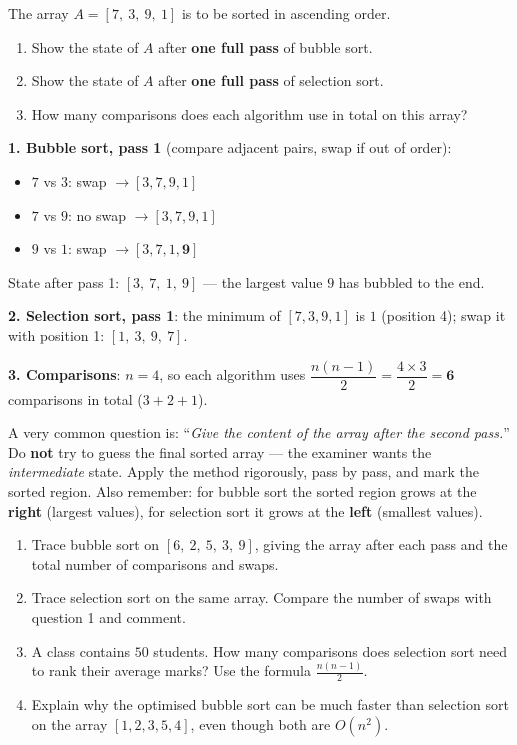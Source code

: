 \documentclass[11pt]{article}
\begin{document}
\begin{exoresolu}
The array $A = [7,\ 3,\ 9,\ 1]$ is to be sorted in ascending order.
\begin{enumerate}
\item Show the state of $A$ after \textbf{one full pass} of bubble sort.
\item Show the state of $A$ after \textbf{one full pass} of selection sort.
\item How many comparisons does each algorithm use in total on this array?
\end{enumerate}
\tcblower
\textbf{1. Bubble sort, pass 1} (compare adjacent pairs, swap if out of order):
\begin{itemize}
\item $7$ vs $3$: swap $\rightarrow [3, 7, 9, 1]$
\item $7$ vs $9$: no swap $\rightarrow [3, 7, 9, 1]$
\item $9$ vs $1$: swap $\rightarrow [3, 7, 1, \mathbf{9}]$
\end{itemize}
State after pass 1: $\boxed{[3,\ 7,\ 1,\ 9]}$ --- the largest value $9$ has bubbled to the end.

\textbf{2. Selection sort, pass 1}: the minimum of $[7,3,9,1]$ is $1$ (position 4); swap it with position 1: $\boxed{[1,\ 3,\ 9,\ 7]}$.

\textbf{3. Comparisons}: $n = 4$, so each algorithm uses $\dfrac{n(n-1)}{2} = \dfrac{4 \times 3}{2} = \mathbf{6}$ comparisons in total ($3+2+1$).
\end{exoresolu}

\begin{attention}
A very common question is: ``\emph{Give the content of the array after the second pass.}'' Do \textbf{not} try to guess the final sorted array --- the examiner wants the \emph{intermediate} state. Apply the method rigorously, pass by pass, and mark the sorted region. Also remember: for bubble sort the sorted region grows at the \textbf{right} (largest values), for selection sort it grows at the \textbf{left} (smallest values).
\end{attention}

\begin{exercice}[Practice]
\begin{enumerate}
\item Trace bubble sort on $[6,\ 2,\ 5,\ 3,\ 9]$, giving the array after each pass and the total number of comparisons and swaps.
\item Trace selection sort on the same array. Compare the number of swaps with question 1 and comment.
\item A class contains $50$ students. How many comparisons does selection sort need to rank their average marks? Use the formula $\frac{n(n-1)}{2}$.
\item Explain why the optimised bubble sort can be much faster than selection sort on the array $[1, 2, 3, 5, 4]$, even though both are $O(n^2)$.
\end{enumerate}
\end{exercice}
\end{document}
